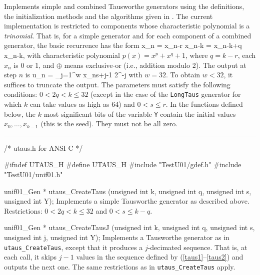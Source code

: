
Implements simple and combined Tausworthe generators using
the definitions, the initialization methods and the
 algorithms given in \cite{rLEC94a,rLEC96a}.
The current implementation is restricted to components whose 
characteristic polynomial is a {\em trinomial}.  That is,
for a  simple generator and for each component of a combined
generator, the basic recurrence has the form %
\eq                                               {}
  x_n = x_{n-r} \oplus x_{n-k} = x_{n-k+q} \oplus x_{n-k},
\endeq
with characteristic polynomial $p(x) = x^p + x^q + 1$,
where $q = k-r$, each $x_n$ is 0 or 1, and $\oplus$ 
means exclusive-or (i.e., addition modulo 2).
The output at step $n$ is
\eq                                               {}
  u_n = \sum_{j=1}^w x_{ns+j-1} 2^{-j}
\endeq
with $w = 32$. 
To obtain $w < 32$, it suffices to truncate the output.
The parameters must satisfy the following conditions:
$0 < 2q < k \le 32$ (except in the case of the {\tt LongTaus} generator
for which $k$ can take values as high as 64) and $0 < s \le r$.
In the functions defined below, the $k$ most significant 
bits of the variable {\tt Y} contain 
the initial values  $x_0,\dots,x_{k-1}$ (this is the seed).
They must not be all zero.

\bigskip
\hrule
\code
\hide
/* utaus.h for ANSI C */

#ifndef UTAUS_H
#define UTAUS_H
\endhide
#include "TestU01/gdef.h"
#include "TestU01/unif01.h"


unif01_Gen * utaus_CreateTaus (unsigned int k, unsigned int q,
                               unsigned int s, unsigned int Y);
\endcode        
  \tab  Implements a simple Tausworthe generator as described above.
   Restrictions: $0 < 2q < k \le 32$ and $0 < s \le k-q$.
  \endtab
\code


unif01_Gen * utaus_CreateTausJ (unsigned int k, unsigned int q,
                                unsigned int s, unsigned int j,
                                unsigned int Y);
\endcode
  \tab  Implements a Tausworthe generator as in {\tt utaus\_CreateTaus},
   except that it produces a $j$-decimated sequence.
   That is, at each call, it skips $j-1$ values in the sequence 
   defined by (\ref{taus1}--\ref{taus2}) and outputs the next one.
   The same restrictions as in {\tt utaus\_CreateTaus} apply.
  \endtab
\code


